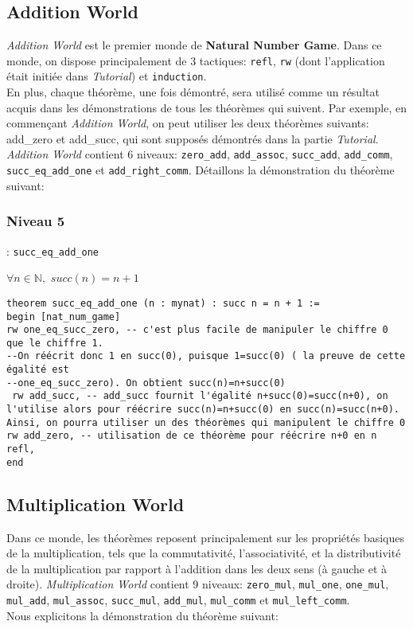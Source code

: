 \subsection{Addition World}
\textit{Addition World} est le premier monde de \textbf{Natural Number Game}. Dans ce monde, on dispose principalement de 3 tactiques: \texttt{refl}, \texttt{rw} (dont l'application était initiée dans \textit{Tutorial}) et \texttt{induction}.\\
En plus, chaque théorème, une fois démontré, sera utilisé comme un résultat acquis dans les démonstrations de tous les théorèmes qui suivent. Par exemple, en commençant \textit{Addition World}, on peut utiliser les deux théorèmes suivants: add\_zero et add\_succ, qui sont supposés démontrés dans la partie \textit{Tutorial}.
\textit{Addition World} contient 6 niveaux: \texttt{zero\_add}, \texttt{add\_assoc}, \texttt{succ\_add}, \texttt{add\_comm}, \texttt{succ\_eq\_add\_one} et \texttt{add\_right\_comm}.
Détaillons la démonstration du théorème suivant:\\
\subsubsection{Niveau 5} : \texttt{succ\_eq\_add\_one} \begin{center}   $\forall n \in \mathbb{N},$  $succ(n)=n+1$ \end{center}

\begin{verbatim}
theorem succ_eq_add_one (n : mynat) : succ n = n + 1 :=
begin [nat_num_game]
rw one_eq_succ_zero, -- c'est plus facile de manipuler le chiffre 0 que le chiffre 1. 
--On réécrit donc 1 en succ(0), puisque 1=succ(0) ( la preuve de cette égalité est
--one_eq_succ_zero). On obtient succ(n)=n+succ(0)
 rw add_succ, -- add_succ fournit l'égalité n+succ(0)=succ(n+0), on l'utilise alors pour réécrire succ(n)=n+succ(0) en succ(n)=succ(n+0). Ainsi, on pourra utiliser un des théorèmes qui manipulent le chiffre 0
rw add_zero, -- utilisation de ce théorème pour réécrire n+0 en n
refl,
end
\end{verbatim}
\subsection{Multiplication World}
Dans ce monde, les théorèmes reposent principalement sur les propriétés basiques de la multiplication, tels que la commutativité, l'associativité, et la distributivité de la multiplication par rapport à l'addition dans les deux sens (à gauche et à droite). \textit{Multiplication World} contient 9 niveaux: \texttt{zero\_mul}, \texttt{mul\_one}, \texttt{one\_mul}, \texttt{mul\_add}, \texttt{mul\_assoc}, \texttt{succ\_mul}, \texttt{add\_mul}, \texttt{mul\_comm} et \texttt{mul\_left\_comm}.\\ Nous explicitons la démonstration du théorème suivant: \\
